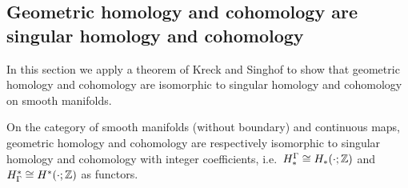 \subsection{Geometric homology and cohomology are singular homology and cohomology}\label{S: homology is homology}

In this section we apply a theorem of Kreck and Singhof to show that geometric homology and cohomology are isomorphic to singular homology and cohomology on smooth manifolds.

\begin{theorem}\label{T: geometric is singular}
On the category of smooth manifolds (without boundary) and continuous maps, geometric homology and cohomology are respectively isomorphic to singular homology and cohomology with integer coefficients, i.e.\ $H_*^\Gamma\cong H_*(\cdot ;\mathbb{Z})$ and $H^*_\Gamma\cong H^*(\cdot ;\mathbb{Z})$ as functors.
\end{theorem}
